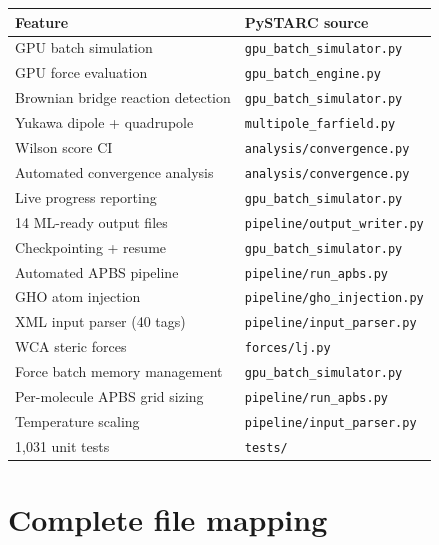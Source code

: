 \documentclass[11pt]{article}
\begin{document}
\begin{longtable}{ll}
\toprule
Feature & PySTARC source \\
\midrule
GPU batch simulation & \texttt{gpu\_batch\_simulator.py} \\
GPU force evaluation & \texttt{gpu\_batch\_engine.py} \\
Brownian bridge reaction detection & \texttt{gpu\_batch\_simulator.py} \\
Yukawa dipole + quadrupole & \texttt{multipole\_farfield.py} \\
Wilson score CI & \texttt{analysis/convergence.py} \\
Automated convergence analysis & \texttt{analysis/convergence.py} \\
Live progress reporting & \texttt{gpu\_batch\_simulator.py} \\
14 ML-ready output files & \texttt{pipeline/output\_writer.py} \\
Checkpointing + resume & \texttt{gpu\_batch\_simulator.py} \\
Automated APBS pipeline & \texttt{pipeline/run\_apbs.py} \\
GHO atom injection & \texttt{pipeline/gho\_injection.py} \\
XML input parser (40 tags) & \texttt{pipeline/input\_parser.py} \\
WCA steric forces & \texttt{forces/lj.py} \\
Force batch memory management & \texttt{gpu\_batch\_simulator.py} \\
Per-molecule APBS grid sizing & \texttt{pipeline/run\_apbs.py} \\
Temperature scaling & \texttt{pipeline/input\_parser.py} \\
1,031 unit tests & \texttt{tests/} \\
\bottomrule
\end{longtable}


\section{Complete file mapping}
\end{document}
